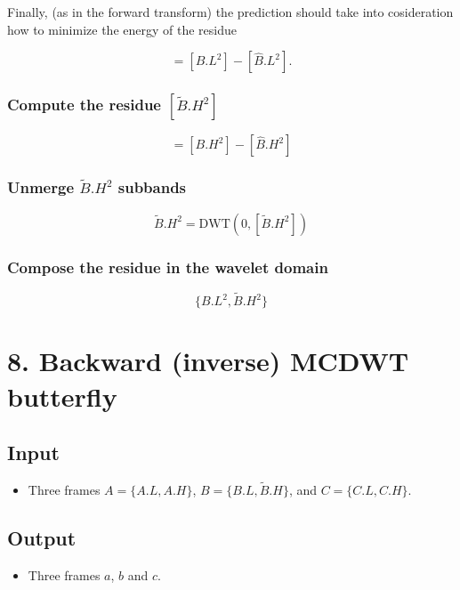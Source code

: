 {Finally, (as in the forward transform) the prediction should take into
cosideration how to minimize the energy of the residue

\begin{equation}
  [\tilde{B}.L^2] = [B.L^2] - [\hat{B}.L^2].
\end{equation}

\subsubsection{Compute the residue $[\tilde{B}.H^2]$}
\begin{equation}
  [\tilde{B}.H^2] = [B.H^2] - [\hat{B}.H^2]
\end{equation}

\subsubsection{Unmerge $\tilde{B}.H^2$ subbands}
\begin{equation}
  \tilde{B}.H^2 = \text{DWT}(0, [\tilde{B}.H^2])
\end{equation}

\hypertarget{compose-the-residue-in-the-wavelet-domain}{%
\subsubsection{Compose the residue in the wavelet
domain}\label{compose-the-residue-in-the-wavelet-domain}}

\begin{equation}
   \{B.L^2, \tilde{B}.H^2\}
\end{equation}

\section{8. Backward (inverse) MCDWT butterfly}
\subsection{Input}
\begin{itemize}
\tightlist
\item
  Three frames $A=\{A.L, A.H\}$, $B=\{B.L, \tilde{B}.H\}$, and
  $C=\{C.L, C.H\}$.
\end{itemize}

\subsection{Output}
\begin{itemize}
\tightlist
\item
  Three frames $a$, $b$ and $c$.
\end{itemize}

}
